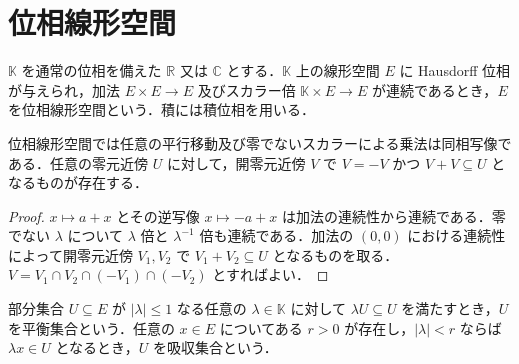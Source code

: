 \section{位相線形空間}
\begin{defn}[位相線形空間]
$\mathbb K$ を通常の位相を備えた $\mathbb R$ 又は $\mathbb C$ とする．$\mathbb K$ 上の線形空間 $E$ に Hausdorff 位相が与えられ，加法 $E\times E\to E$ 及びスカラー倍 $\mathbb K\times E\to E$ が連続であるとき，$E$ を位相線形空間という．積には積位相を用いる．
\end{defn}
\begin{prop}[零元近傍と平行移動]
位相線形空間では任意の平行移動及び零でないスカラーによる乗法は同相写像である．任意の零元近傍 $U$ に対して，開零元近傍 $V$ で $V=-V$ かつ $V+V\subseteq U$ となるものが存在する．
\end{prop}
\begin{proof}
$x\mapsto a+x$ とその逆写像 $x\mapsto -a+x$ は加法の連続性から連続である．零でない $\lambda$ について $\lambda$ 倍と $\lambda^{-1}$ 倍も連続である．加法の $(0,0)$ における連続性によって開零元近傍 $V_1,V_2$ で $V_1+V_2\subseteq U$ となるものを取る．$V=V_1\cap V_2\cap(-V_1)\cap(-V_2)$ とすればよい．
\end{proof}
\begin{defn}[平衡集合と吸収集合]
部分集合 $U\subseteq E$ が $|\lambda|\leq1$ なる任意の $\lambda\in\mathbb K$ に対して $\lambda U\subseteq U$ を満たすとき，$U$ を平衡集合という．任意の $x\in E$ についてある $r>0$ が存在し，$|\lambda|<r$ ならば $\lambda x\in U$ となるとき，$U$ を吸収集合という．
\end{defn}
